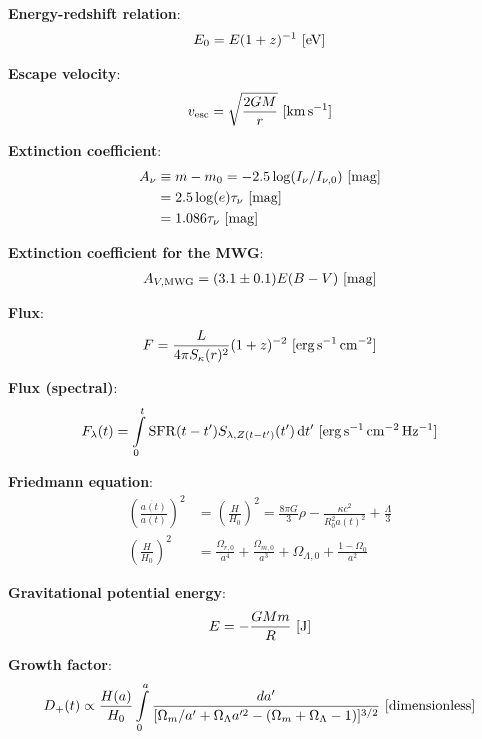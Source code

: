 \documentclass[a4paper,11pt]{article}
\begin{document}
{\noindent}\textbf{Energy-redshift relation}:
\begin{align*}
    E_0 = E(1+z)^{-1} ~ [{\rm eV}]
\end{align*}

{\noindent}\textbf{Escape velocity}:
\begin{align*}
    v_\mathrm{esc} = \sqrt{\frac{2GM}{r}} ~ [{\rm km\,s^{-1}}]
\end{align*}

{\noindent}\textbf{Extinction coefficient}:
\begin{align*}
    A_\nu &\equiv m-m_0 = -2.5\log(I_\nu/I_{\nu,0}) ~ [{\rm mag}] \\
          &= 2.5\log(e)\tau_\nu ~ [{\rm mag}] \\
          &= 1.086\tau_\nu ~ [{\rm mag}]
\end{align*}

{\noindent}\textbf{Extinction coefficient for the MWG}:
\begin{align*}
    A_{V,\mathrm{MWG}} = (3.1\pm0.1)E(B-V) ~ [{\rm mag}]
\end{align*}

{\noindent}\textbf{Flux}:
\begin{align*}
    F = \frac{L}{4\pi S_\kappa(r)^2}(1+z)^{-2} ~ [{\rm erg\,s^{-1}\,cm^{-2}}]
\end{align*}

{\noindent}\textbf{Flux (spectral)}:
\begin{align*}
    F_\lambda(t) = \int\limits_0^t \mathrm{SFR}(t-t')S_{\lambda,Z(t-t')}(t')\,\mathrm{d}t' ~ [{\rm erg\,s^{-1}\,cm^{-2}\,Hz^{-1}}]
\end{align*}

{\noindent}\textbf{Friedmann equation}:
\begin{align*}
    \left(\frac{\dot{a(t)}}{a(t)}\right)^2 &=  \left(\frac{H}{H_0}\right)^2 = \frac{8\pi G}{3}\rho - \frac{\kappa c^2}{R_0^2a(t)^2} + \frac{\Lambda}{3} \\
    \left(\frac{H}{H_0}\right)^2 &= \frac{\Omega_{r,0}}{a^4} + \frac{\Omega_{m,0}}{a^3} + \Omega_{\Lambda,0} + \frac{1-\Omega_0}{a^2}
\end{align*}

{\noindent}\textbf{Gravitational potential energy}:
\begin{align*}
    E = -\frac{GMm}{R} ~ [{\rm J}]
\end{align*}

{\noindent}\textbf{Growth factor}:
\begin{align*}
    D_+(t) \propto \frac{H(a)}{H_0}\int\limits_0^a \frac{da'}{[\Omega_m/a'+\Omega_\Lambda a'^2-(\Omega_m+\Omega_\Lambda-1)]^{3/2}} ~ [{\rm dimensionless}]
\end{align*}
\end{document}
